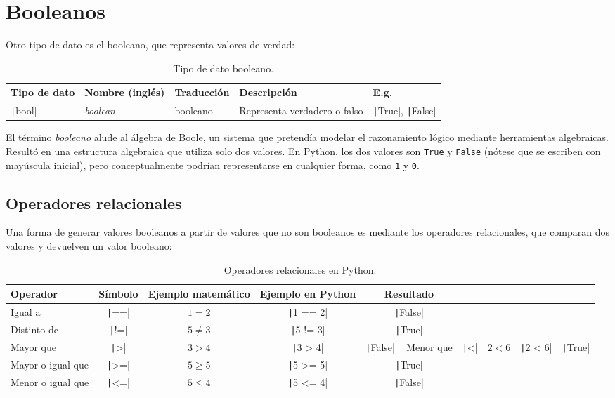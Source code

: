 
\section{Booleanos}

Otro tipo de dato es el booleano, que representa valores de verdad:
\begin{table}[h]
\centering
\footnotesize
\begin{tabular}{|l|l|l|p{3.5cm}|l|}
\hline
\textbf{Tipo de dato} & \textbf{Nombre (inglés)} & \textbf{Traducción} & \textbf{Descripción} & \textbf{E.g.} \\
\hline
\texttt|bool| & \textit{boolean} & booleano & Representa verdadero o falso & \texttt|True|, \texttt|False| \\
\hline
\end{tabular}
\normalsize
\caption{Tipo de dato booleano.}
\label{tab:tipo-dato-booleano}
\end{table}

El término \emph{booleano} alude al álgebra de Boole, un sistema que pretendía modelar el razonamiento lógico mediante herramientas algebraicas. Resultó en una estructura algebraica que utiliza solo dos valores. En Python, los dos valores son \texttt{True} y \texttt{False} (nótese que se escriben con mayúscula inicial), pero conceptualmente podrían representarse en cualquier forma, como \texttt{1} y \texttt{0}.

\subsection{Operadores relacionales}

Una forma de generar valores booleanos a partir de valores que no son booleanos es mediante los operadores relacionales, que comparan dos valores y devuelven un valor booleano:
\begin{table}[h]
\centering
\begin{tabular}{|l|c|c|c|c|}
\hline
\textbf{Operador} & \textbf{Símbolo} & \textbf{Ejemplo matemático} & \textbf{Ejemplo en Python} & \textbf{Resultado} \\
\hline
Igual a & \texttt|==| & $1 = 2$ & \texttt|1 == 2| & \texttt|False| \\
\hline
Distinto de & \texttt|!=| & $5 \neq 3$ & \texttt|5 != 3| & \texttt|True| \\
\hline
Mayor que & \texttt|>| & $3 > 4$ & \texttt|3 > 4| & \texttt|False| \
\hline
Menor que & \texttt|<| & $2 < 6$ & \texttt|2 < 6| & \texttt|True| \\
\hline
Mayor o igual que & \texttt|>=| & $5 \geq 5$ & \texttt|5 >= 5| & \texttt|True| \\
\hline
Menor o igual que & \texttt|<=| & $5 \leq 4$ & \texttt|5 <= 4| & \texttt|False| \\
\hline
\end{tabular}
\caption{Operadores relacionales en Python.}
\label{tab:operadores-relacionales}
\end{table}

